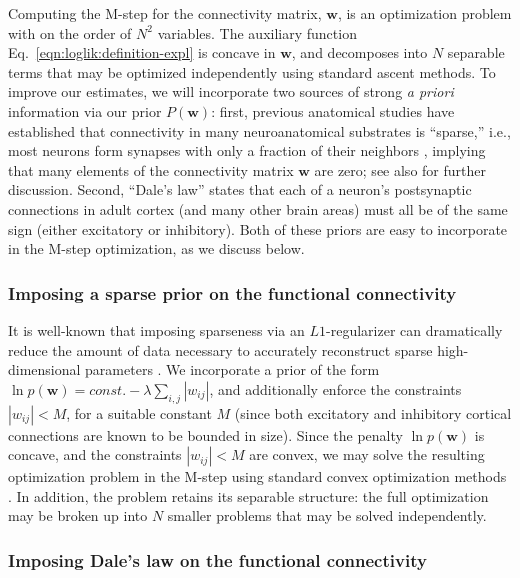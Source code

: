 \documentclass[aoas,preprint]{imsart}
\newcommand{\w}{w}
\newcommand{\bw}{\mathbf{\w}}
\begin{document}
Computing the M-step for the connectivity matrix, $\bw$, is an optimization problem with on the order of $N^2$ variables. The auxiliary function Eq.~\eqref{eqn:loglik:definition-expl} is concave in $\bw$, and decomposes into $N$ separable terms that may be optimized independently using standard ascent methods. To improve our estimates, we will incorporate two sources of strong \emph{a priori} information via our prior $P(\bw)$: first, previous anatomical studies have established that connectivity in many neuroanatomical substrates is ``sparse,'' i.e., most neurons form synapses with only a fraction of their neighbors \cite{Buhl94,Thompson88,Reyes98,Feldmeyer99,Gupta00,FeldmeyerSakmann00,PetersenSakmann00,Binzegger04,Song2005,Mishchenko2009b}, implying that many elements of the connectivity matrix $\bw$ are zero; see also \cite{PAN04c,Rigat06,PILL07,Stevenson08} for further discussion. Second, ``Dale's law'' states that each of a neuron's postsynaptic connections in adult cortex (and many other brain areas) must all be of the same sign (either excitatory or inhibitory). Both of these priors are easy to incorporate in the M-step optimization, as we discuss below.


\subsubsection{Imposing a sparse prior on the functional connectivity}

It is well-known that imposing sparseness via an $L1$-regularizer can dramatically reduce the amount of data necessary to accurately reconstruct sparse high-dimensional parameters \cite{Tibs96,TIP01,DE03,NG04,Candes2005,Mishchenko2009}. We incorporate a prior of the form $\ln p(\bw) = const. - \lambda \sum_{i,j} |\w_{ij}|$, and additionally enforce the constraints $|\w_{ij}|<M$, for a suitable constant $M$ (since both excitatory and inhibitory cortical connections are known to be bounded in size). Since the penalty $\ln p(\bw)$ is concave, and the constraints $|\w_{ij}|<M$ are convex, we may solve the resulting optimization problem in the M-step using standard convex optimization methods \cite{CONV04}. In addition, the problem retains its separable structure: the full optimization may be broken up into $N$ smaller problems that may be solved independently.

\subsubsection{Imposing Dale's law on the functional connectivity}
\end{document}
